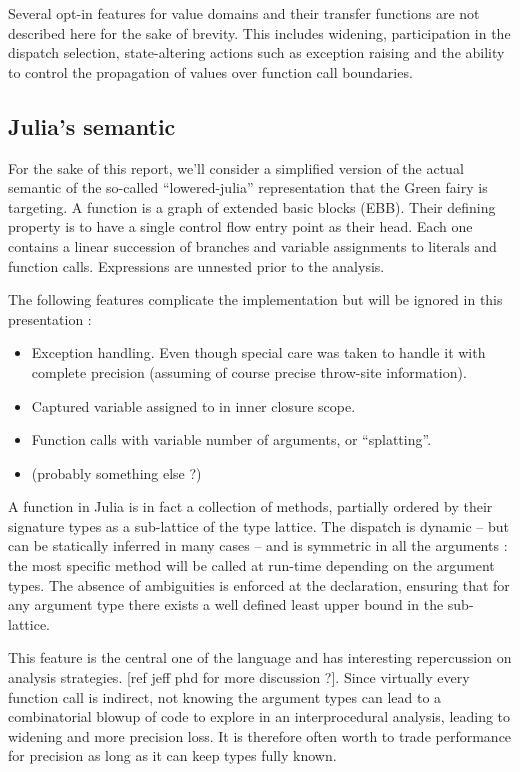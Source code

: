 \documentclass[11pt]{article}
\begin{document}
Several opt-in features for value domains and their transfer functions are not described here for the sake of brevity. This includes widening, participation in the dispatch selection, state-altering actions such as exception raising and the ability to control the propagation of values over function call boundaries.

\subsection*{Julia's semantic}

For the sake of this report, we'll consider a simplified version of the actual semantic of the so-called ``lowered-julia'' representation that the Green fairy is targeting. A function is a graph of extended basic blocks (EBB). Their defining property is to have a single control flow entry point as their head. Each one contains a linear succession of branches and variable assignments to literals and function calls. Expressions are unnested prior to the analysis.

The following features complicate the implementation but will be ignored in this presentation :
\begin{itemize}
\item Exception handling. Even though special care was taken to handle it with complete precision (assuming of course precise throw-site information).
\item Captured variable assigned to in inner closure scope.
\item Function calls with variable number of arguments, or ``splatting''.
\item (probably something else ?)
\end{itemize}

A function in Julia is in fact a collection of methods, partially ordered by their signature types as a sub-lattice of the type lattice.
The dispatch is dynamic -- but can be statically inferred in many cases -- and is symmetric in all the arguments : the most specific method will be called at run-time depending on the argument types.
The absence of ambiguities is enforced at the declaration, ensuring that for any argument type there exists a well defined least upper bound in the sub-lattice.

This feature is the central one of the language and has interesting repercussion on analysis strategies. [ref jeff phd for more discussion ?]. Since virtually every function call is indirect, not knowing the argument types can lead to a combinatorial blowup of code to explore in an interprocedural analysis, leading to widening and more precision loss. It is therefore often worth to trade performance for precision as long as it can keep types fully known.
\end{document}
